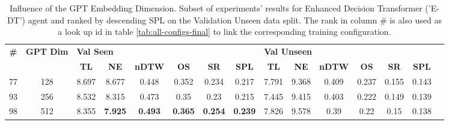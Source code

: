 \begin{table}
\centering
\caption{\label{tab:e_dt_dim_test}Influence of the GPT Embedding Dimension. Subset of experiments' results for Enhanced Decision Transformer ('E-DT') agent and ranked by descending SPL on the Validation Unseen data split. The rank in column \# is also used as a look up id in table \ref{tab:all-configs-final} to link the corresponding training configuration.}
\begin{tabular}{@{\hskip3pt}c@{\hskip3pt}c@{\hskip3pt}c@{\hskip3pt}c@{\hskip3pt}c@{\hskip3pt}c@{\hskip3pt}c@{\hskip3pt}c@{\hskip3pt}c@{\hskip3pt}c@{\hskip3pt}c@{\hskip3pt}c@{\hskip3pt}c@{\hskip3pt}c@{\hskip3pt}c}
\toprule
\textbf{\#} & \textbf{GPT Dim} & \multicolumn{6}{l}{\textbf{Val Seen}} & \multicolumn{6}{l}{\textbf{Val Unseen}} \\
 \textbf{~} &       \textbf{~} &       \textbf{TL} &     \textbf{NE} &   \textbf{nDTW} &     \textbf{OS} &     \textbf{SR} &    \textbf{SPL} &         \textbf{TL} & \textbf{NE} & \textbf{nDTW} & \textbf{OS} & \textbf{SR} & \textbf{SPL} \\
\midrule
         77 &              128 &             8.697 &           8.677 &           0.448 &           0.352 &           0.234 &           0.217 &               7.791 &       9.368 &         0.409 &       0.237 &       0.155 &        0.143 \\
         93 &              256 &             8.532 &           8.315 &           0.473 &            0.35 &            0.23 &           0.215 &               7.445 &       9.415 &         0.403 &       0.222 &       0.149 &        0.139 \\
         98 &              512 &             8.355 &  \textbf{7.925} &  \textbf{0.493} &  \textbf{0.365} &  \textbf{0.254} &  \textbf{0.239} &               7.826 &       9.578 &          0.39 &        0.22 &        0.15 &        0.138 \\
\bottomrule
\end{tabular}
\end{table}
